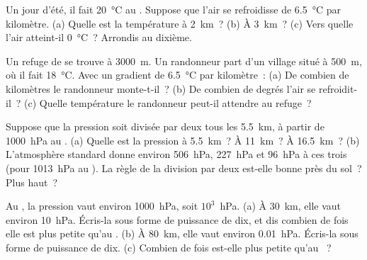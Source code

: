 \begin{exercise}[$\star\star$]\label{exo:g8:the-atmosphere:5}
Un jour d'été, il fait \qty{20}{\degreeCelsius} au .
Suppose que l'air se refroidisse de \qty{6.5}{\degreeCelsius} par
kilomètre. (a) Quelle est la température à \qty{2}{km}~? (b) À
\qty{3}{km}~? (c) Vers quelle  l'air atteint-il
\qty{0}{\degreeCelsius}~? Arrondis au dixième.
\end{exercise}

\begin{exercise}[$\star\star$]\label{exo:g8:the-atmosphere:6}
Un refuge de  se trouve à \qty{3000}{m}. Un randonneur part d'un
village situé à \qty{500}{m}, où il fait \qty{18}{\degreeCelsius}. Avec un
gradient de \qty{6.5}{\degreeCelsius} par kilomètre~: (a) De combien de
kilomètres le randonneur monte-t-il~? (b) De combien de degrés l'air se
refroidit-il~? (c) Quelle température le randonneur peut-il attendre au
refuge~?
\end{exercise}

\begin{exercise}[$\star\star$]\label{exo:g8:the-atmosphere:7}
Suppose que la pression soit divisée par deux tous les \qty{5.5}{km}, à
partir de \qty{1000}{hPa} au . (a) Quelle est la pression
à \qty{5.5}{km}~? À \qty{11}{km}~? À \qty{16.5}{km}~? (b) L'atmosphère
standard donne environ \qty{506}{hPa}, \qty{227}{hPa} et \qty{96}{hPa} à
ces trois  (pour \qty{1013}{hPa} au ). La règle
de la division par deux est-elle bonne près du sol~? Plus haut~?
\end{exercise}

\begin{exercise}[$\star\star$]\label{exo:g8:the-atmosphere:8}
Au , la pression vaut environ \qty{1000}{hPa}, soit
$10^3$~hPa. (a) À \qty{30}{km}, elle vaut environ \qty{10}{hPa}. Écris-la
sous forme de puissance de dix, et dis combien de fois elle est plus
petite qu'au . (b) À \qty{80}{km}, elle vaut environ
\qty{0.01}{hPa}. Écris-la sous forme de puissance de dix. (c) Combien de
fois est-elle plus petite qu'au ~?
\end{exercise}

